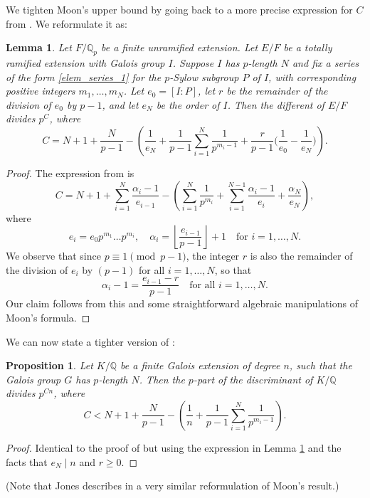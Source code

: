 \documentclass{amsart}
\newtheorem{prop}[theorem]{Proposition}
\newtheorem{lemma}[theorem]{Lemma}
\theoremstyle{definition}
\newcommand{\Q}{\mathbb{Q}}
\renewcommand{\geq}{\geqslant}
\begin{document}
We tighten Moon's upper bound by going back to a more precise expression for $C$ from \cite[Lemma 2.3]{Mo1}.
We reformulate it as:
\begin{lemma}\label{lem:exact_C}
  Let $F/\Q_p$ be a finite unramified extension.
  Let $E/F$ be a totally ramified extension with Galois group $I$.
  Suppose $I$ has $p$-length $N$ and fix a series of the form \eqref{elem_series_1} for the $p$-Sylow subgroup $P$ of $I$, with corresponding positive integers $m_1,\dots,m_N$.
  Let $e_0=[I\colon P]$, let $r$ be the remainder of the division of $e_0$ by $p-1$, and let $e_N$ be the order of $I$.
  Then the different of $E/F$ divides $p^C$, where
  \begin{equation*}
    C=N+1+\frac{N}{p-1}-\left(\frac{1}{e_N}+\frac{1}{p-1}\sum_{i=1}^N \frac{1}{p^{m_i-1}}+\frac{r}{p-1}\Big(\frac{1}{e_0}-\frac{1}{e_N}\Big)\right).
  \end{equation*}
\end{lemma}
\begin{proof}
  The expression from \cite[Lemma 2.3]{Mo1} is
  \begin{equation*}
    C = N+1+\sum_{i=1}^N \frac{\alpha_i-1}{e_{i-1}} - \left(\sum_{i=1}^N \frac{1}{p^{m_i}} + \sum_{i=1}^{N-1} \frac{\alpha_i-1}{e_i} + \frac{\alpha_N}{e_N}\right),
  \end{equation*}
  where
  \begin{equation*}
    e_i = e_0 p^{m_1}\dots p^{m_i},\quad \alpha_i = \left\lfloor \frac{e_{i-1}}{p-1}\right\rfloor + 1\quad \text{for }i=1,\dots,N.
  \end{equation*}
  We observe that since $p\equiv 1\pmod{p-1}$, the integer $r$ is also the remainder of the division of $e_i$ by $(p-1)$ for all $i=1,\dots,N$, so that
  \begin{equation*}
    \alpha_i-1=\frac{e_{i-1}-r}{p-1}\quad\text{for all }i=1,\dots,N.
  \end{equation*}
  Our claim follows from this and some straightforward algebraic manipulations of Moon's formula.
\end{proof}

We can now state a tighter version of \cite[Proposition 2.4]{Mo1}:
\begin{prop}\label{prop:upper_bound_C}
  Let $K/\Q$ be a finite Galois extension of degree $n$, such that the Galois group $G$ has $p$-length $N$.
  Then the $p$-part of the discriminant of $K/\Q$ divides $p^{Cn}$, where
  \begin{equation*}
    C < N + 1 + \frac{N}{p-1} - \left(\frac{1}{n}+\frac{1}{p-1}\sum_{i=1}^N \frac{1}{p^{m_i-1}}\right).
  \end{equation*}
\end{prop}
\begin{proof}
  Identical to the proof of \cite[Proposition 2.4]{Mo1} but using the expression in Lemma \ref{lem:exact_C} and the facts that $e_N\mid n$ and $r\geq 0$.
\end{proof}
(Note that Jones describes in \cite[Proposition 2.3]{Jo} a very similar reformulation of Moon's result.)
\end{document}
